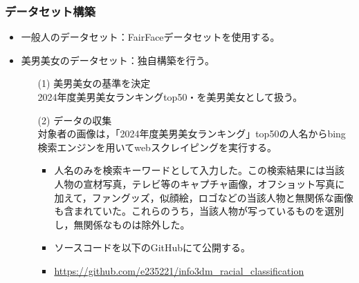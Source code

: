 \documentclass[a4paper,11pt,titlepage]{jsarticle}
\begin{document}
\subsubsection{データセット構築}
\begin{itemize}
    \item 一般人のデータセット：FairFaceデータセットを使用する。
    \item 美男美女のデータセット：独自構築を行う。
        \begin{itemize}
            \item[(1)] 美男美女の基準を決定 \\
                2024年度美男美女ランキングtop50\cite{bidanshi}・\cite{bijoshi}を美男美女として扱う。
            \item[(2)] データの収集 \\
                対象者の画像は，「2024年度美男美女ランキング」top50の人名からbing検索エンジンを用いてwebスクレイピングを実行する。
                \begin{itemize}
                	\item	人名のみを検索キーワードとして入力した。この検索結果には当該人物の宣材写真，テレビ等のキャプチャ画像，オフショット写真に加えて，ファングッズ，似顔絵，ロゴなどの当該人物と無関係な画像も含まれていた。これらのうち，当該人物が写っているものを選別し，無関係なものは除外した。
                    \item ソースコードを以下のGitHubにて公開する。
                    \item \url{https://github.com/e235221/info3dm_racial_classification}
                \end{itemize}
        \end{itemize}
\end{itemize}
    
\end{document}
